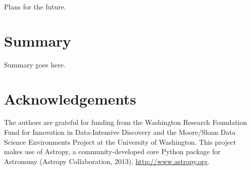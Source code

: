 \documentclass{emulateapj}
\begin{document}
Plans for the future.


\section{Summary}
\label{summary}

Summary goes here.



\section*{Acknowledgements}
The authors are grateful for funding from the Washington Research Foundation Fund for Innovation in Data-Intensive Discovery and the Moore/Sloan Data Science Environments Project at the University of Washington. This project makes use of Astropy, a community-developed core Python package for Astronomy (Astropy Collaboration, 2013), \url{http://www.astropy.org}.




\end{document}
